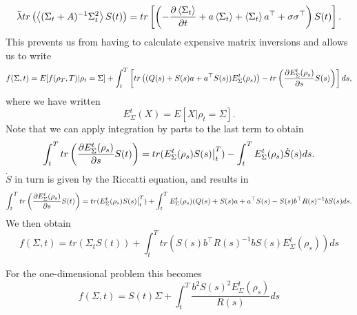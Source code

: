 \[
\bar{\lambda} tr\left(\left< (\Sigma_t + A)^{-1} \Sigma_t^2\right>S(t)\right) = tr\left[\left(-\frac{\partial \left<\Sigma_t\right>}{\partial t} + a \left<\Sigma_t\right> + \left<\Sigma_t\right> a^\top + \sigma\sigma^\top\right)S(t)\right]. 
\]
This prevents us from having to calculate expensive matrix inversions and allows us to write
\[
f(\Sigma,t) =E[f(\rho_T,T)|\rho_t=\Sigma] + \int_t^T\left[ tr\left((Q(s)+S(s)a + a^\top S(s))E^t_{\Sigma}(\rho_s)\right)-tr\left( \frac{\partial E^t_\Sigma(\rho_s)}{\partial s} S(s)\right)\right]ds,
\]
where we have written
\[
E^t_\Sigma(X) = E[X|\rho_t=\Sigma].
\]
Note that we can apply integration by parts to the last term to obtain
\[
\int_t^T tr\left( \frac{\partial E^t_\Sigma(\rho_s)}{\partial s} S(t)\right) = tr(E^t_\Sigma(\rho_s) S(s)\big|_t^T) - \int_t^T E^t_\Sigma(\rho_s) \dot{S}(s)ds.
\]
$\dot{S}$ in turn is given by the Riccatti equation, and results in
\[
\int_t^T tr\left( \frac{\partial E^t_\Sigma(\rho_s)}{\partial s} S(t)\right) =  tr(E^t_\Sigma(\rho_s) S(s)\big|_t^T) + \int_t^T E^t_\Sigma(\rho_s) (Q(s) + S(s) a + a^\top S(s) -S(s) b^\top R(s)^{-1} b S(s)ds.
\]
We then obtain
\[
f(\Sigma,t)  = tr\left(\Sigma_t S(t)\right) + \int_t^T tr \left(S(s) b^\top R(s)^{-1}b S(s) E^t_\Sigma(\rho_s)\right) ds
\]

For the one-dimensional problem this becomes
\[
f(\Sigma,t) = S(t) \Sigma + \int_t^T \frac{b^2 S(s)^2 E^t_\Sigma(\rho_s)}{R(s)}ds 
\]

